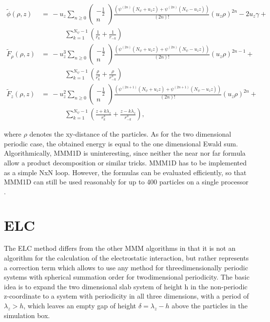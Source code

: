 \[ \begin{array}{rl} \tilde{\phi}(\rho,z) &=\, -u_z\sum_{n\ge 0}
  \left(\begin{array}{c}-\frac{1}{2}\\n\end{array}\right)
  \frac{\left(\psi^{(2n)}(N_\psi + u_z z) + \psi^{(2n)}(N_\psi - u_z
      z)\right)}{(2n)!}(u_z\rho)^{2n} - 2u_z\gamma + \\
  &\phantom{=\,++}
  \sum_{k=1}^{N_\psi-1}\left(\frac{1}{r_k}+\frac{1}{r_{-k}}\right)\\
  \tilde{F}_\rho(\rho,z) &=\, -u_z^3 \sum_{n\ge 0}
  \left(\begin{array}{c}-\frac{1}{2}\\n\end{array}\right)
  \frac{\left(\psi^{(2n)}(N_\psi + u_z z) + \psi^{(2n)}(N_\psi - u_z
      z)\right)}{(2n)!}(u_z\rho)^{2n-1} + \\ &\phantom{=\,++}
  \sum_{k=1}^{N_\psi-1}\left(\frac{\rho}{r_k^3}+\frac{\rho}{r_{-k}^3}\right)
  \\ \tilde{F}_z(\rho,z) &=\, -u_z^2 \sum_{n\ge 0}
  \left(\begin{array}{c}-\frac{1}{2}\\n\end{array}\right)
  \frac{\left(\psi^{(2n + 1)}(N_\psi + u_z z) + \psi^{(2n + 1)}(N_\psi
      - u_z z)\right)}{(2n)!}(u_z\rho)^{2n} + \\ &\phantom{=\,++}
  \sum_{k=1}^{N_\psi-1}\left(\frac{z+k\lambda_z}{r_k^3}+\frac{z-k\lambda_z}{r_{-k}^3}\right),
\end{array} \]

where $\rho$ denotes the xy-distance of the particles. As for the two
dimensional periodic case, the obtained energy is equal to the one
dimensional Ewald sum. Algorithmically, MMM1D is uninteresting, since
neither the near nor far formula allow a product decomposition or
similar tricks. MMM1D has to be implemented as a simple NxN loop.
However, the formulas can be evaluated efficiently, so that MMM1D can
still be used reasonably for up to 400 particles on a single
processor \citep{mmm1d}.

\section{ELC}

The ELC method differs from the other MMM algorithms in that it is not
an algorithm for the calculation of the electrostatic interaction, but
rather represents a correction term which allows to use any method for
threedimensionally periodic systems with spherical summation order for
twodimensional periodicity. The basic idea is to expand the two
dimensional slab system of height h in the non-periodic z-coordinate
to a system with periodicity in all three dimensions, with a period of
$\lambda_z>h$, which leaves an empty gap of height $\delta=\lambda_z -
h$ above the particles in the simulation box.

